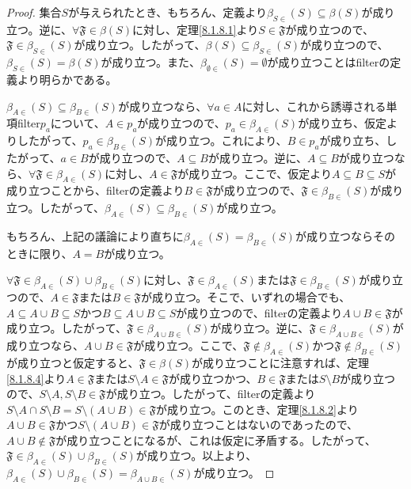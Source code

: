 \documentclass[dvipdfmx]{jsarticle}
\begin{document}
\begin{proof}
集合$S$が与えられたとき、もちろん、定義より$\beta_{S \in}(S) \subseteq \beta(S)$が成り立つ。逆に、$\mathfrak{\forall F \in}\beta(S)$に対し、定理\ref{8.1.8.1}より$S \in \mathfrak{F}$が成り立つので、$\mathfrak{F}\in \beta_{S \in}(S)$が成り立つ。したがって、$\beta(S) \subseteq \beta_{S \in}(S)$が成り立つので、$\beta_{S \in}(S) = \beta(S)$が成り立つ。また、$\beta_{\emptyset \in}(S) = \emptyset$が成り立つことはfilterの定義より明らかである。\par
$\beta_{A \in}(S) \subseteq \beta_{B \in}(S)$が成り立つなら、$\forall a \in A$に対し、これから誘導される単項filter$p_{a}$について、$A \in p_{a}$が成り立つので、$p_{a} \in \beta_{A \in}(S)$が成り立ち、仮定よりしたがって、$p_{a} \in \beta_{B \in}(S)$が成り立つ。これにより、$B \in p_{a}$が成り立ち、したがって、$a \in B$が成り立つので、$A \subseteq B$が成り立つ。逆に、$A \subseteq B$が成り立つなら、$\mathfrak{\forall F \in}\beta_{A \in}(S)$に対し、$A \in \mathfrak{F}$が成り立つ。ここで、仮定より$A \subseteq B \subseteq S$が成り立つことから、filterの定義より$B \in \mathfrak{F}$が成り立つので、$\mathfrak{F}\in \beta_{B \in}(S)$が成り立つ。したがって、$\beta_{A \in}(S) \subseteq \beta_{B \in}(S)$が成り立つ。\par
もちろん、上記の議論により直ちに$\beta_{A \in}(S) = \beta_{B \in}(S)$が成り立つならそのときに限り、$A = B$が成り立つ。\par
$\mathfrak{\forall F \in}\beta_{A \in}(S) \cup \beta_{B \in}(S)$に対し、$\mathfrak{F}\in \beta_{A \in}(S)$または$\mathfrak{F}\in \beta_{B \in}(S)$が成り立つので、$A \in \mathfrak{F}$または$B \in \mathfrak{F}$が成り立つ。そこで、いずれの場合でも、$A \subseteq A \cup B \subseteq S$かつ$B \subseteq A \cup B \subseteq S$が成り立つので、filterの定義より$A \cup B \in \mathfrak{F}$が成り立つ。したがって、$\mathfrak{F}\in \beta_{A \cup B \in}(S)$が成り立つ。逆に、$\mathfrak{F}\in \beta_{A \cup B \in}(S)$が成り立つなら、$A \cup B \in \mathfrak{F}$が成り立つ。ここで、$\mathfrak{F \notin}\beta_{A \in}(S)$かつ$\mathfrak{F \notin}\beta_{B \in}(S)$が成り立つと仮定すると、$\mathfrak{F}\in \beta(S)$が成り立つことに注意すれば、定理\ref{8.1.8.4}より$A \in \mathfrak{F}$または$S \setminus A \in \mathfrak{F}$が成り立つかつ、$B \in \mathfrak{F}$または$S \setminus B$が成り立つので、$S \setminus A,S \setminus B \in \mathfrak{F}$が成り立つ。したがって、filterの定義より$S \setminus A \cap S \setminus B = S \setminus (A \cup B)\in \mathfrak{F}$が成り立つ。このとき、定理\ref{8.1.8.2}より$A \cup B \in \mathfrak{F}$かつ$S \setminus (A \cup B)\in \mathfrak{F}$が成り立つことはないのであったので、$A \cup B \notin \mathfrak{F}$が成り立つことになるが、これは仮定に矛盾する。したがって、$\mathfrak{F}\in \beta_{A \in}(S) \cup \beta_{B \in}(S)$が成り立つ。以上より、$\beta_{A \in}(S) \cup \beta_{B \in}(S) = \beta_{A \cup B \in}(S)$が成り立つ。\par

\end{proof}
\end{document}
